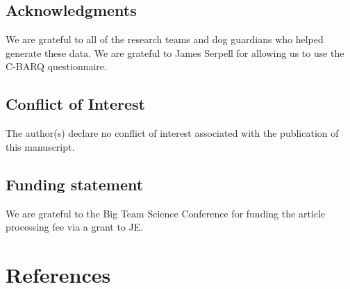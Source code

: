 \documentclass[
  man,floatsintext]{apa6}
\begin{document}
\hypertarget{acknowledgments}{%
\subsection{Acknowledgments}\label{acknowledgments}}

We are grateful to all of the research teams and dog guardians who helped generate these data. We are grateful to James Serpell for allowing us to use the C-BARQ questionnaire.

\hypertarget{conflict-of-interest}{%
\subsection{Conflict of Interest}\label{conflict-of-interest}}

The author(s) declare no conflict of interest associated with the publication of this manuscript.

\hypertarget{funding-statement}{%
\subsection{Funding statement}\label{funding-statement}}

We are grateful to the Big Team Science Conference for funding the article processing fee via a grant to JE.

\newpage

\hypertarget{references}{%
\section{References}\label{references}}
\end{document}
